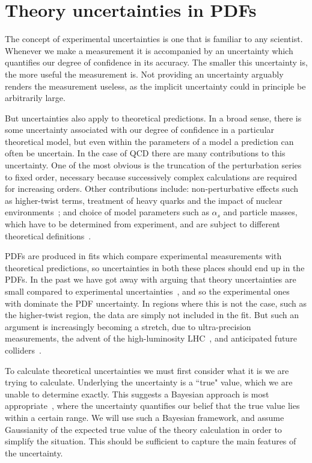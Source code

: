 \chapter{Theory uncertainties in PDFs}
\label{chapter:thuncs}
The concept of experimental uncertainties is one that is familiar to any scientist. Whenever we make a measurement it is accompanied by an uncertainty which quantifies our degree of confidence in its accuracy. The smaller this uncertainty is, the more useful the measurement is. Not providing an uncertainty arguably renders the measurement useless, as the implicit uncertainty could in principle be arbitrarily large. 

But uncertainties also apply to theoretical predictions. In a broad sense, there is some uncertainty associated with our degree of confidence in a particular theoretical model, but even within the parameters of a model a prediction can often be uncertain. In the case of QCD there are many contributions to this uncertainty. One of the most obvious is the truncation of the perturbation series to fixed order, necessary because successively complex calculations are required for increasing orders. Other contributions include: non-perturbative effects such as higher-twist terms, treatment of heavy quarks and the impact of nuclear environments~\cite{Forte:2010ta, Ball:2013gsa}; and choice of model parameters such as $\alpha_s$ and particle masses, which have to be determined from experiment, and are subject to different theoretical definitions~\cite{Hoang:2014oea,Ball:2018iqk}.

PDFs are produced in fits which compare experimental measurements with theoretical predictions, so uncertainties in both these places should end up in the PDFs. In the past we have got away with arguing that theory uncertainties are small compared to experimental uncertainties~\cite{Ball:2013gsa}, and so the experimental ones with dominate the PDF uncertainty. In regions where this is not the case, such as the higher-twist region, the data are simply not included in the fit. But such an argument is increasingly becoming a stretch, due to ultra-precision measurements, the advent of the high-luminosity LHC~\cite{HL-LHC}, and anticipated future colliders~\cite{FCC, CLIC, ILC}.

To calculate theoretical uncertainties we must first consider what it is we are trying to calculate. Underlying the uncertainty is a ``true" value, which we are unable to determine exactly. This suggests a Bayesian approach is most appropriate~\cite{DAgostini:1998klm,DAgostini:2003bpu}, where the uncertainty quantifies our belief that the true value lies within a certain range. We will use such a Bayesian framework, and assume Gaussianity of the expected true value of the theory calculation in order to simplify the situation. This should be sufficient to capture the main features of the uncertainty. 

